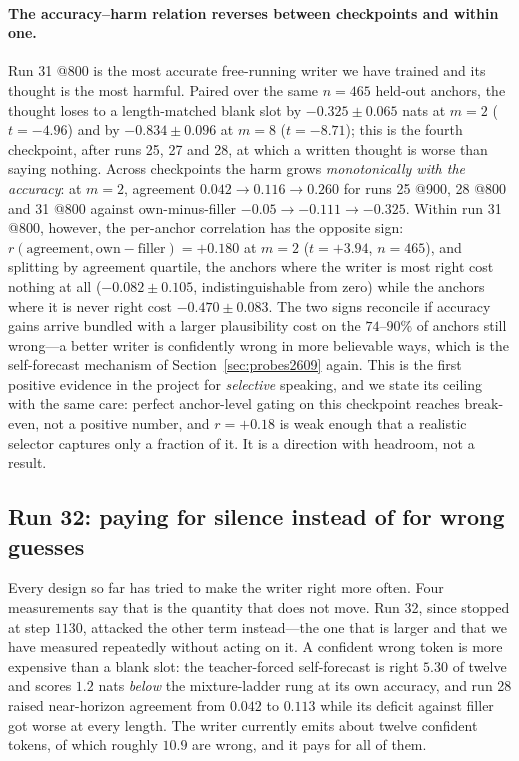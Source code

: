 \documentclass{article} %
\begin{document}
\paragraph{The accuracy--harm relation reverses between checkpoints and within one.} Run 31 @800 is the
most accurate free-running writer we have trained and its thought is the most harmful. Paired over the
same $n=465$ held-out anchors, the thought loses to a length-matched blank slot by
$-0.325 \pm 0.065$ nats at $m=2$ ($t=-4.96$) and by $-0.834 \pm 0.096$ at $m=8$ ($t=-8.71$); this is the
fourth checkpoint, after runs 25, 27 and 28, at which a written thought is worse than saying nothing.
Across checkpoints the harm grows \emph{monotonically with the accuracy}: at $m=2$, agreement
$0.042 \to 0.116 \to 0.260$ for runs 25 @900, 28 @800 and 31 @800 against own-minus-filler
$-0.05 \to -0.111 \to -0.325$. Within run 31 @800, however, the per-anchor correlation has the opposite
sign: $r(\text{agreement}, \text{own}-\text{filler}) = +0.180$ at $m=2$ ($t=+3.94$, $n=465$), and
splitting by agreement quartile, the anchors where the writer is most right cost nothing at all
($-0.082 \pm 0.105$, indistinguishable from zero) while the anchors where it is never right cost
$-0.470 \pm 0.083$. The two signs reconcile if accuracy gains arrive bundled with a larger plausibility
cost on the $74$--$90\%$ of anchors still wrong---a better writer is confidently wrong in more
believable ways, which is the self-forecast mechanism of Section~\ref{sec:probes2609} again. This is the
first positive evidence in the project for \emph{selective} speaking, and we state its ceiling with the
same care: perfect anchor-level gating on this checkpoint reaches break-even, not a positive number, and
$r=+0.18$ is weak enough that a realistic selector captures only a fraction of it. It is a direction
with headroom, not a result.

\subsection{Run 32: paying for silence instead of for wrong guesses}
\label{sec:run32}

Every design so far has tried to make the writer right more often. Four measurements say that is the
quantity that does not move. Run 32, since stopped at step $1130$, attacked the other term instead---the
one that is larger and that we have measured repeatedly without acting on it. A confident wrong token
is more expensive than a blank slot: the teacher-forced self-forecast is right $5.30$ of twelve and
scores $1.2$ nats \emph{below} the mixture-ladder rung at its own accuracy, and run 28 raised
near-horizon agreement from $0.042$ to $0.113$ while its deficit against filler got worse at every
length. The writer currently emits about twelve confident tokens, of which roughly $10.9$ are wrong,
and it pays for all of them.
\end{document}
